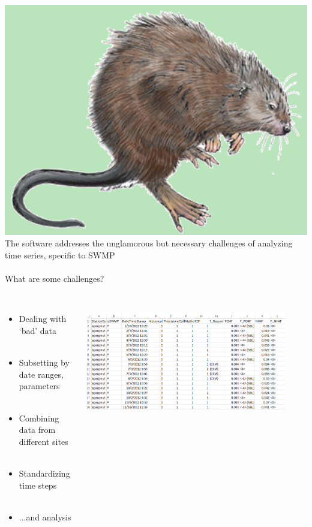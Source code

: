 \documentclass[serif]{beamer}\usepackage[]{graphicx}\usepackage[]{color}
\begin{document}
\begin{frame}[fragile]{\includegraphics[width=0.05\paperwidth]{fig/muskrat.png}\hspace{0.07in}{\bf SWMPrats.net: The SWMPr package}}
The software addresses the unglamorous but necessary challenges of analyzing time series, specific to SWMP \\~\\
What are some challenges? \\~\\
\begin{columns}
\begin{column}{0.6\textwidth}
\begin{itemize}
\item Dealing with `bad' data \\~\\
\item Subsetting by date ranges, parameters \\~\\
\item Combining data from different sites \\~\\
\item Standardizing time steps \\~\\
\item ...and analysis
\end{itemize}
\end{column}
\begin{column}{0.4\textwidth}
\centerline{\includegraphics[width = 0.9\textwidth]{fig/qaqc_ex.png}}
\end{column}
\end{columns}
\end{frame}
\end{document}
